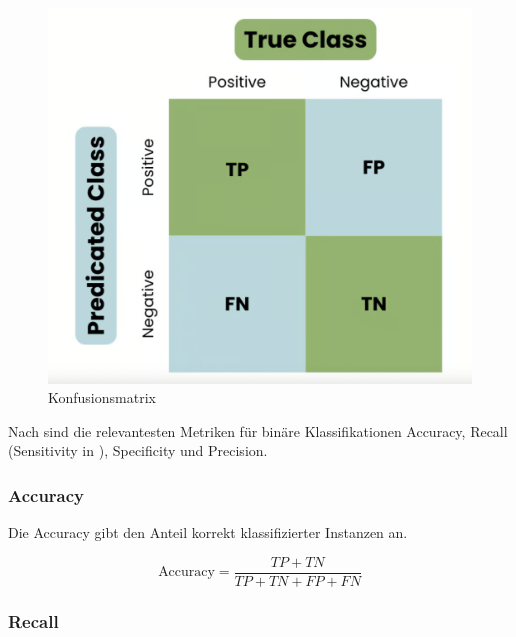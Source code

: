 \begin{figure}[htbp]
    \begin{center}
        \includegraphics[scale=0.3]{static/confusion_matrix.png}
        \caption[Konfusionsmatrix]{\label{fig:confusion_matrix} Konfusionsmatrix\footnotemark}
    \end{center}
\end{figure}

Nach \cite{kivimaeki2025, Rainio:2024aa} sind die relevantesten Metriken für binäre Klassifikationen Accuracy, Recall (Sensitivity in \cite{Rainio:2024aa}), 
Specificity und Precision. 

\subsubsection{Accuracy}

Die Accuracy gibt den Anteil korrekt klassifizierter Instanzen an.

\begin{equation}
    \text{Accuracy} = \frac{TP + TN}{TP + TN + FP + FN}
\end{equation}

\subsubsection{Recall}

